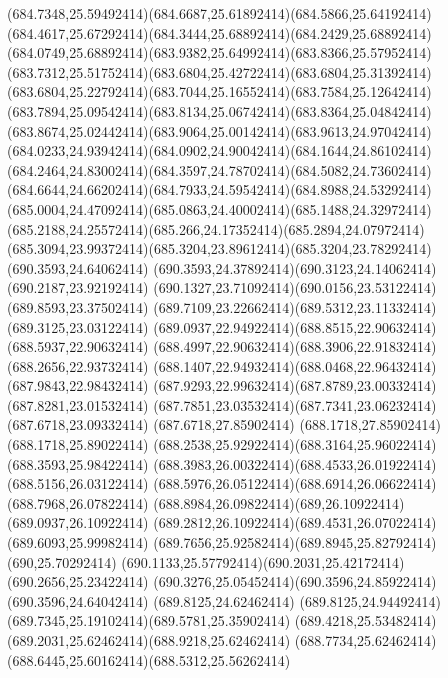 {{	\curveto(684.7348,25.59492414)(684.6687,25.61892414)(684.5866,25.64192414)
	\curveto(684.4617,25.67292414)(684.3444,25.68892414)(684.2429,25.68892414)
	\curveto(684.0749,25.68892414)(683.9382,25.64992414)(683.8366,25.57952414)
	\curveto(683.7312,25.51752414)(683.6804,25.42722414)(683.6804,25.31392414)
	\curveto(683.6804,25.22792414)(683.7044,25.16552414)(683.7584,25.12642414)
	\curveto(683.7894,25.09542414)(683.8134,25.06742414)(683.8364,25.04842414)
	\curveto(683.8674,25.02442414)(683.9064,25.00142414)(683.9613,24.97042414)
	\curveto(684.0233,24.93942414)(684.0902,24.90042414)(684.1644,24.86102414)
	\curveto(684.2464,24.83002414)(684.3597,24.78702414)(684.5082,24.73602414)
	\curveto(684.6644,24.66202414)(684.7933,24.59542414)(684.8988,24.53292414)
	\curveto(685.0004,24.47092414)(685.0863,24.40002414)(685.1488,24.32972414)
	\curveto(685.2188,24.25572414)(685.266,24.17352414)(685.2894,24.07972414)
	\curveto(685.3094,23.99372414)(685.3204,23.89612414)(685.3204,23.78292414)
	\closepath
	\moveto(690.3593,24.64062414)
	\curveto(690.3593,24.37892414)(690.3123,24.14062414)(690.2187,23.92192414)
	\curveto(690.1327,23.71092414)(690.0156,23.53122414)(689.8593,23.37502414)
	\curveto(689.7109,23.22662414)(689.5312,23.11332414)(689.3125,23.03122414)
	\curveto(689.0937,22.94922414)(688.8515,22.90632414)(688.5937,22.90632414)
	\curveto(688.4997,22.90632414)(688.3906,22.91832414)(688.2656,22.93732414)
	\curveto(688.1407,22.94932414)(688.0468,22.96432414)(687.9843,22.98432414)
	\curveto(687.9293,22.99632414)(687.8789,23.00332414)(687.8281,23.01532414)
	\curveto(687.7851,23.03532414)(687.7341,23.06232414)(687.6718,23.09332414)
	\lineto(687.6718,27.85902414)
	\lineto(688.1718,27.85902414)
	\lineto(688.1718,25.89022414)
	\curveto(688.2538,25.92922414)(688.3164,25.96022414)(688.3593,25.98422414)
	\curveto(688.3983,26.00322414)(688.4533,26.01922414)(688.5156,26.03122414)
	\curveto(688.5976,26.05122414)(688.6914,26.06622414)(688.7968,26.07822414)
	\curveto(688.8984,26.09822414)(689,26.10922414)(689.0937,26.10922414)
	\curveto(689.2812,26.10922414)(689.4531,26.07022414)(689.6093,25.99982414)
	\curveto(689.7656,25.92582414)(689.8945,25.82792414)(690,25.70292414)
	\curveto(690.1133,25.57792414)(690.2031,25.42172414)(690.2656,25.23422414)
	\curveto(690.3276,25.05452414)(690.3596,24.85922414)(690.3596,24.64042414)
	\closepath
	\moveto(689.8125,24.62462414)
	\curveto(689.8125,24.94492414)(689.7345,25.19102414)(689.5781,25.35902414)
	\curveto(689.4218,25.53482414)(689.2031,25.62462414)(688.9218,25.62462414)
	\curveto(688.7734,25.62462414)(688.6445,25.60162414)(688.5312,25.56262414)
}}
